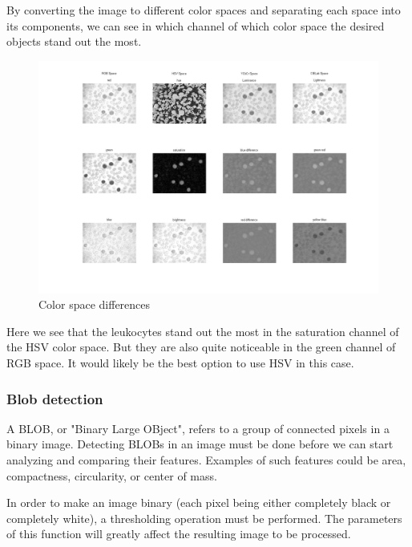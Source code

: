 			By converting the image to different color spaces and separating each space into its components, we can see in which channel of which color space the desired objects stand out the most. 
			
					\begin{figure}[H]
				\centering
				\includegraphics[width=\linewidth]{figure/Analysis/differences.jpg}
				\caption{Color space differences}
				\label{fig:differences}
			\end{figure}
		Here we see that the leukocytes stand out the most in the saturation channel of the HSV color space. But they are also quite noticeable in the green channel of RGB space. It would likely be the best option to use HSV in this case. 
	
			\subsubsection{Blob detection}
			
			A BLOB, or "Binary Large OBject", refers to a group of connected pixels in a binary image. Detecting BLOBs in an image must be done before we can start analyzing and comparing their features. Examples of such features could be area, compactness, circularity, or center of mass.
			
			In order to make an image binary (each pixel being either completely black or completely white), a thresholding operation must be performed. The parameters of this function will greatly affect the resulting image to be processed. 
			
